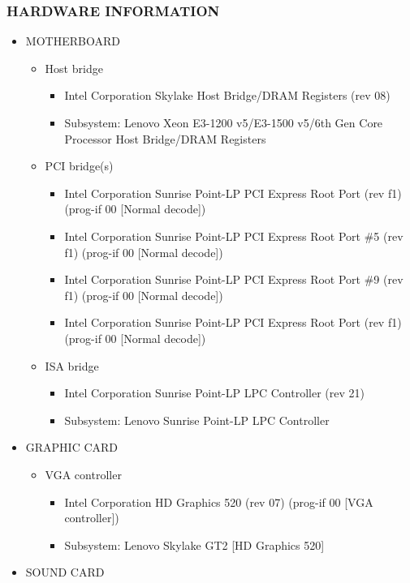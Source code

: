 \documentclass[a4paper]{report}
\begin{document}
\subsubsection{HARDWARE INFORMATION}
\begin{itemize}
\item MOTHERBOARD
\begin{itemize}
\item Host bridge
\begin{itemize}
\item Intel Corporation Skylake Host Bridge/DRAM Registers (rev 08)
\item Subsystem: Lenovo Xeon E3-1200 v5/E3-1500 v5/6th Gen Core Processor Host Bridge/DRAM Registers
\end{itemize}
\item PCI bridge(s)
\begin{itemize}
\item Intel Corporation Sunrise Point-LP PCI Express Root Port (rev f1) (prog-if 00 [Normal decode])
\item Intel Corporation Sunrise Point-LP PCI Express Root Port \#5 (rev f1) (prog-if 00 [Normal decode])
\item Intel Corporation Sunrise Point-LP PCI Express Root Port \#9 (rev f1) (prog-if 00 [Normal decode])
\item Intel Corporation Sunrise Point-LP PCI Express Root Port (rev f1) (prog-if 00 [Normal decode])
\end{itemize}
\item ISA bridge
\begin{itemize}
\item Intel Corporation Sunrise Point-LP LPC Controller (rev 21)
\item Subsystem: Lenovo Sunrise Point-LP LPC Controller
\end{itemize}
\end{itemize}
\item GRAPHIC CARD
\begin{itemize}
\item VGA controller
\begin{itemize}
\item Intel Corporation HD Graphics 520 (rev 07) (prog-if 00 [VGA controller])
\item Subsystem: Lenovo Skylake GT2 [HD Graphics 520]
\end{itemize}
\end{itemize}
\item SOUND CARD
\begin{itemize}

\end{itemize}
\end{itemize}
\end{document}
